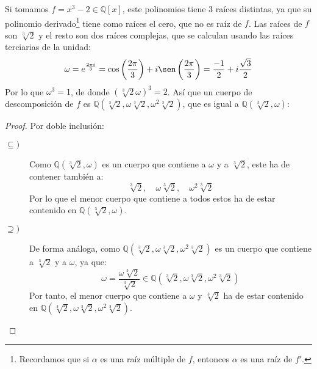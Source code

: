 \begin{ejemplo}
    Si tomamos $f=x^3-2\in \mathbb{Q}[x]$, este polinomios tiene 3 raíces distintas, ya que su polinomio derivado\footnote{Recordamos que si $\alpha$ es una raíz múltiple de $f$, entonces $\alpha$ es una raíz de $f'$.} tiene como raíces el cero, que no es raíz de $f$. Las raíces de $f$ son $\sqrt[3]{2}$ y el resto son dos raíces complejas, que se calculan usando las raíces terciarias de la unidad:
    \begin{equation*}
        \omega = e^{\frac{2\pi i}{3}} = \cos\left(\frac{2\pi}{3}\right) + i\sen\left(\frac{2\pi}{3}\right) = \dfrac{-1}{2} + i \dfrac{\sqrt{3}}{2}
    \end{equation*}
    Por lo que $\omega^3 = 1$, de donde ${\left(\sqrt[3]{2}\omega\right)}^{3} = 2$. Así que un cuerpo de descomposición de $f$ es $\mathbb{Q}\left(\sqrt[3]{2}, \omega\sqrt[3]{2}, \omega^2\sqrt[3]{2}\right)$, que es igual a $\mathbb{Q}\left(\sqrt[3]{2},\omega\right)$:
    \begin{proof}
        Por doble inclusión:
        \begin{description}
            \item [$\subseteq )$] Como $\mathbb{Q}\left(\sqrt[3]{2}, \omega\right)$ es un cuerpo que contiene a $\omega$ y a $\sqrt[3]{2}$, este ha de contener también a:
                \begin{equation*}
                    \sqrt[3]{2}, \quad \omega\sqrt[3]{2}, \quad \omega^2 \sqrt[3]{2}
                \end{equation*}
                Por lo que el menor cuerpo que contiene a todos estos ha de estar contenido en $\mathbb{Q}\left(\sqrt[3]{2}, \omega\right)$.
            \item [$\supseteq )$] De forma análoga, como $\mathbb{Q}\left(\sqrt[3]{2}, \omega\sqrt[3]{2}, \omega^2\sqrt[3]{2}\right)$ es un cuerpo que contiene a $\sqrt[3]{2}$ y a $\omega$, ya que:
                \begin{equation*}
                    \omega = \dfrac{\omega \sqrt[3]{2}}{\sqrt[3]{2}} \in \mathbb{Q}\left(\sqrt[3]{2}, \omega\sqrt[3]{2}, \omega^2\sqrt[3]{2}\right)
                \end{equation*}
                Por tanto, el menor cuerpo que contiene a $\omega$ y $\sqrt[3]{2}$ ha de estar contenido en $\mathbb{Q}\left(\sqrt[3]{2}, \omega\sqrt[3]{2}, \omega^2\sqrt[3]{2}\right)$.
        \end{description}
    \end{proof}
\end{ejemplo}

